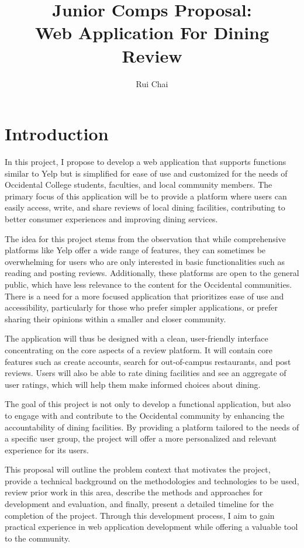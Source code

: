 \documentclass[10pt,twocolumn]{article}
\title{Junior Comps Proposal: \\ Web Application For Dining Review }
\author{Rui Chai}
\affiliation{Occidental College}
\begin{document}
\maketitle

\section{Introduction}
In this project, I propose to develop a web application that supports functions similar to Yelp but is simplified for ease of use and customized for the needs of Occidental College students, faculties, and local community members. The primary focus of this application will be to provide a platform where users can easily access, write, and share reviews of local dining facilities, contributing to better consumer experiences and improving dining services.

The idea for this project stems from the observation that while comprehensive platforms like Yelp offer a wide range of features, they can sometimes be overwhelming for users who are only interested in basic functionalities such as reading and posting reviews. Additionally, these platforms are open to the general public, which have less relevance to the content for the Occidental communities. There is a need for a more focused application that prioritizes ease of use and accessibility, particularly for those who prefer simpler applications, or prefer sharing their opinions within a smaller and closer community.

The application will thus be designed with a clean, user-friendly interface concentrating on the core aspects of a review platform. It will contain core features such as create accounts, search for out-of-campus restaurants, and post reviews. Users will also be able to rate dining facilities and see an aggregate of user ratings, which will help them make informed choices about dining.

The goal of this project is not only to develop a functional application, but also to engage with and contribute to the Occidental community by enhancing the accountability of dining facilities. By providing a platform tailored to the needs of a specific user group, the project will offer a more personalized and relevant experience for its users.

This proposal will outline the problem context that motivates the project, provide a technical background on the methodologies and technologies to be used, review prior work in this area, describe the methods and approaches for development and evaluation, and finally, present a detailed timeline for the completion of the project. Through this development process, I aim to gain practical experience in web application development while offering a valuable tool to the community.
\end{document}
